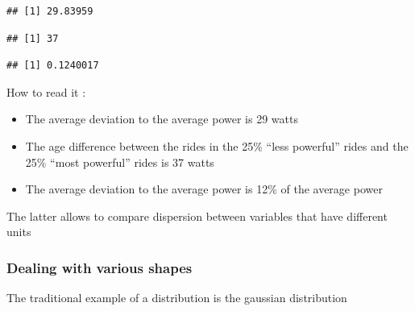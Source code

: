 \documentclass[
]{book}
\newenvironment{Shaded}{\begin{snugshade}}{\end{snugshade}}
\newcommand{\CommentTok}[1]{\textcolor[rgb]{0.56,0.35,0.01}{\textit{#1}}}
\newcommand{\DataTypeTok}[1]{\textcolor[rgb]{0.13,0.29,0.53}{#1}}
\newcommand{\KeywordTok}[1]{\textcolor[rgb]{0.13,0.29,0.53}{\textbf{#1}}}
\newcommand{\NormalTok}[1]{#1}
\newcommand{\OperatorTok}[1]{\textcolor[rgb]{0.81,0.36,0.00}{\textbf{#1}}}
\providecommand{\tightlist}{%
  \setlength{\itemsep}{0pt}\setlength{\parskip}{0pt}}
\begin{document}
\begin{verbatim}
## [1] 29.83959
\end{verbatim}

\begin{Shaded}
\end{Shaded}

\begin{verbatim}
## [1] 37
\end{verbatim}

\begin{Shaded}
\end{Shaded}

\begin{verbatim}
## [1] 0.1240017
\end{verbatim}

How to read it :

\begin{itemize}
\tightlist
\item
  The average deviation to the average power is 29 watts
\item
  The age difference between the rides in the 25\% ``less powerful'' rides and the 25\% ``most powerful'' rides is 37 watts
\item
  The average deviation to the average power is 12\% of the average power
\end{itemize}

The latter allows to compare dispersion between variables that have different units

\hypertarget{dealing-with-various-shapes}{%
\subsubsection{Dealing with various shapes}\label{dealing-with-various-shapes}}

The traditional example of a distribution is the gaussian distribution
\end{document}
